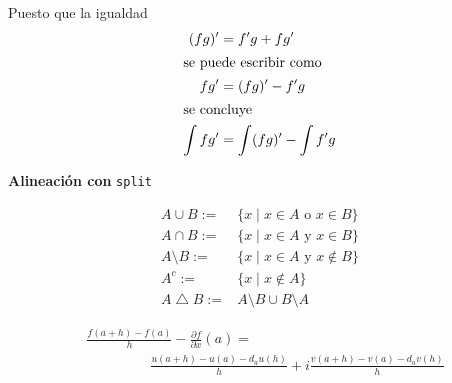 \documentclass[12pt]{book}
\begin{document}
\newpage

\noindent Puesto que la igualdad
\begin{align*}
	(fg)^{\prime}&=f^{\prime}g+fg^{\prime}\\
	\intertext{se puede escribir como}
	fg^{\prime}&=(fg)^{\prime}-f^{\prime}g\\
	\intertext{se concluye}
	\int fg^{\prime}&=\int (fg)^{\prime}-\int f^{\prime}g
\end{align*}





\noindent\textbf{Alineación con } \verb*|split|


\begin{equation*}
	\begin{split}
				A\cup B:=&\{x\mid x\in A \text{ o } x\in B\}\\
		A\cap B:=&\{x\mid x\in A \text{ y } x\in B\} \\
		A\setminus B:=&\{x\mid x\in A \text{ y } x\notin B\}\\
		A^{c}:=&\{x\mid x\notin A \} \\
		A\bigtriangleup  B:=&A\setminus B\cup B\setminus A
	\end{split}
\end{equation*}


\begin{equation*}
\begin{split}
&\frac{f(a+h)-f(a)}h-\frac{\partial f}{\partial x}(a)=\\
&\phantom{f(a+h)}\frac{u(a+h)-u(a)-d_au(h)}h +i\frac{v(a+h)-v(a)-
d_av(h)}h
\end{split}
\end{equation*}
\end{document}
